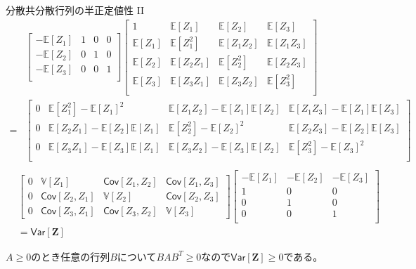\documentclass[lualatex,handout]{beamer}
\newcommand{\expt}[1]{\mathbb{E}\left[#1\right]}
\newcommand{\var}[1]{\mathbb{V}\left[#1\right]}
\newcommand{\cov}[1]{\mathsf{Cov}\left[#1\right]}
\newcommand{\vc}[1]{\mathsf{Var}\left[#1\right]}
\theoremstyle{definition}
\begin{document}
\begin{frame}{分散共分散行列の半正定値性 II}
\scriptsize
\begin{align*}
&
\begin{bmatrix}
-\expt{Z_1}&1&0&0\\
-\expt{Z_2}&0&1&0\\
-\expt{Z_3}&0&0&1\\
\end{bmatrix}
\begin{bmatrix}
1&\expt{Z_1}&\expt{Z_2}&\expt{Z_3}\\
\expt{Z_1}&\expt{Z_1^2}&\expt{Z_1Z_2}&\expt{Z_1Z_3}\\
\expt{Z_2}&\expt{Z_2Z_1}&\expt{Z_2^2}&\expt{Z_2Z_3}\\
\expt{Z_3}&\expt{Z_3Z_1}&\expt{Z_3Z_2}&\expt{Z_3^2}\\
\end{bmatrix}\\
=&
\begin{bmatrix}
0&\expt{Z_1^2}-\expt{Z_1}^2&\expt{Z_1Z_2}-\expt{Z_1}\expt{Z_2}&\expt{Z_1Z_3}-\expt{Z_1}\expt{Z_3}\\
0&\expt{Z_2Z_1}-\expt{Z_2}\expt{Z_1}&\expt{Z_2^2}-\expt{Z_2}^2&\expt{Z_2Z_3}-\expt{Z_2}\expt{Z_3}\\
0&\expt{Z_3Z_1}-\expt{Z_3}\expt{Z_1}&\expt{Z_3Z_2}-\expt{Z_3}\expt{Z_2}&\expt{Z_3^2}-\expt{Z_3}^2\\
\end{bmatrix}\\
\end{align*}
\begin{align*}
&
\begin{bmatrix}
0&\var{Z_1}&\cov{Z_1, Z_2}&\cov{Z_1, Z_3}\\
0&\cov{Z_2, Z_1}&\var{Z_2}&\cov{Z_2, Z_3}\\
0&\cov{Z_3, Z_1}&\cov{Z_3, Z_2}&\var{Z_3}
\end{bmatrix}
\begin{bmatrix}
-\expt{Z_1}& -\expt{Z_2}& -\expt{Z_3}\\
1&0&0\\
0&1&0\\
0&0&1\\
\end{bmatrix}\\
&=\vc{\symbf{Z}}
\end{align*}

$A\ge 0$のとき任意の行列$B$について$BAB^T\ge 0$なので$\vc{\symbf{Z}}\ge 0$である。
\end{frame}
\end{document}
